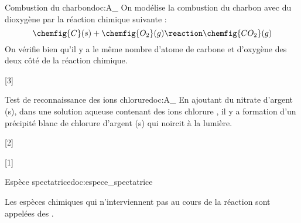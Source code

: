 \begin{doc}{Combustion du charbon}{doc:A_}
  On modélise la combustion du charbon avec du dioxygène par la réaction chimique suivante :
  \begin{equation*}
    \chemfig{C}(s) + \chemfig{O_2}(g) \reaction \chemfig{CO_2}(g)
  \end{equation*}
  On vérifie bien qu'il y a le même nombre d'atome de carbone et d'oxygène des deux côté de la réaction chimique.
\end{doc}


[3]



\begin{doc}{Test de reconnaissance des ions chlorure}{doc:A_}
  En ajoutant du nitrate d'argent (s), dans une solution aqueuse contenant des ions chlorure , il y a formation d'un précipité blanc de chlorure d'argent (s) qui noircit à la lumière.
\end{doc}

[2]

[1]

\vspace*{-4pt}
\begin{doc}{Espèce spectatrice}{doc:espece_spectatrice}
  \begin{importants}
    Les espèces chimiques qui n'interviennent pas au cours de la réaction sont appelées des .
  \end{importants}
\end{doc}
